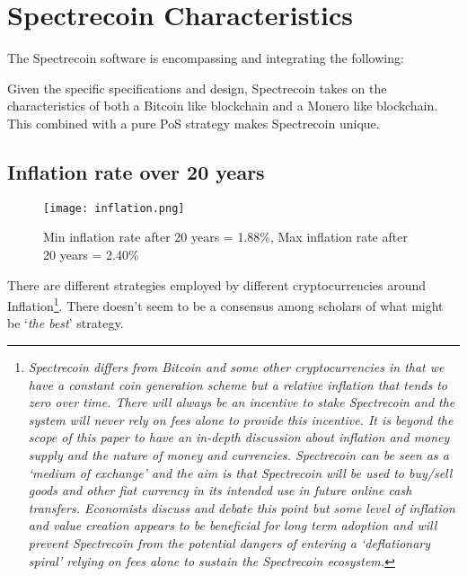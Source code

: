 \section{Spectrecoin Characteristics}
The Spectrecoin software is encompassing and integrating the following:

\begin{table}[h]
\end{table}
\noindent
Given the specific specifications and design, Spectrecoin takes on the characteristics of both a Bitcoin like blockchain and a Monero like blockchain. This combined with a pure PoS strategy makes Spectrecoin unique.

\subsection{Inflation rate over 20 years}
\begin{figure}[h]
	\centering
	\texttt{[image: inflation.png]}
	\caption{Min inflation rate after 20 years = 1.88\%, Max inflation 
	rate after 20 years = 2.40\% }
\end{figure}
\noindent
There are different strategies employed by different cryptocurrencies around 
Inflation\footnote{\textit{Spectrecoin differs from Bitcoin and some other 
cryptocurrencies in that we have a constant coin generation scheme 
but a relative inflation that tends to zero over time. There will 
always be an incentive to stake Spectrecoin and the system will never 
rely on fees alone to provide this incentive. It is beyond the scope 
of this paper to have an in-depth discussion about inflation and money 
supply and the nature of money and currencies. Spectrecoin can be seen 
as a ‘medium of exchange’ and the aim is that Spectrecoin will be used 
to buy/sell goods and other fiat currency in its intended use in future 
online cash transfers. Economists discuss and debate this point but some 
level of inflation and value creation appears to be beneficial for long 
term adoption and will prevent Spectrecoin from the potential dangers of 
entering a ‘deflationary spiral’ relying on fees alone to sustain the 
Spectrecoin ecosystem.}}. There doesn’t seem to be a consensus among 
scholars of what might be ‘\textit{the best}’ strategy.
\newpage

